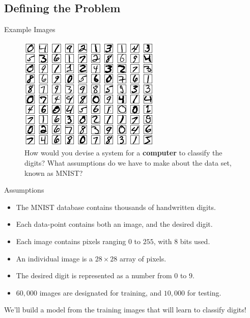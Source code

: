 \documentclass[xcolor=dvipsnames, fontsize=11pt, %
pagesize, %
parskip=half-, t]{beamer}
\begin{document}
\subsection{Defining the Problem}
\begin{frame}[c]{Example Images}
\begin{figure} 
\center
\includegraphics{mnist_100_digits.png}
\caption{How would you devise a system for a \textbf{computer} to classify the digits? What assumptions do we have to make about the data set, known as MNIST? }
\end{figure}
\end{frame}

\begin{frame}[c]{Assumptions}
\begin{itemize}
\item The MNIST database contains thousands of handwritten digits.  \pause 
\item Each data-point contains both an image, and the desired digit. \pause 
\item Each image contains pixels ranging $0$ to $255$, with $8$ bits used. 
\item  An individual image is a $28\times 28$ array of pixels.\pause  
\item The desired digit is represented as a number from $0$ to $9$. \pause 
\item $60,000$ images are designated for training, and $10,000$ for testing. \pause 
\end{itemize}
We'll build a model from the training images that will learn to classify digits!
\end{frame}
\end{document}
